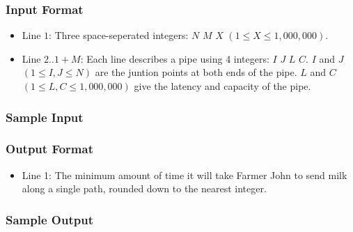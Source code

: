 \subsubsection{Input Format}
\begin{itemize}
	\item Line $1$: Three space-seperated integers: $N$ $M$ $X$ $(1 \leq X \leq 1,000,000)$.
	\item Line $2..1+M$: Each line describes a pipe using 4 integers: $I$ $J$ $L$ $C$.
			$I$ and $J$ $(1 \leq I,J \leq N)$ are the juntion points at both ends of the pipe.
			$L$ and $C$ $(1 \leq L,C \leq 1,000,000)$ give the latency and capacity of the pipe.
\end{itemize}

\subsubsection{Sample Input}

\subsubsection{Output Format}
\begin{itemize}
	\item Line 1: The minimum amount of time it will take Farmer John to send milk along a single path, 
			rounded down to the nearest integer.
\end{itemize}

\subsubsection{Sample Output}
